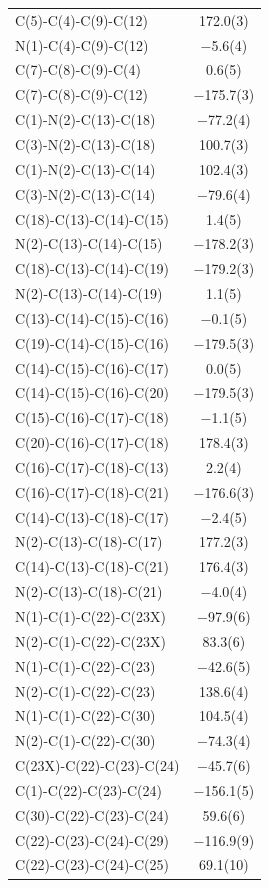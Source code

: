 \begin{center}
{\begin{supertabular}{p{1.8in}c}
C(5)-C(4)-C(9)-C(12)&172.0(3)\\
N(1)-C(4)-C(9)-C(12)&$-$5.6(4)\\
C(7)-C(8)-C(9)-C(4)&0.6(5)\\
C(7)-C(8)-C(9)-C(12)&$-$175.7(3)\\
C(1)-N(2)-C(13)-C(18)&$-$77.2(4)\\
C(3)-N(2)-C(13)-C(18)&100.7(3)\\
C(1)-N(2)-C(13)-C(14)&102.4(3)\\
C(3)-N(2)-C(13)-C(14)&$-$79.6(4)\\
C(18)-C(13)-C(14)-C(15)&1.4(5)\\
N(2)-C(13)-C(14)-C(15)&$-$178.2(3)\\
C(18)-C(13)-C(14)-C(19)&$-$179.2(3)\\
N(2)-C(13)-C(14)-C(19)&1.1(5)\\
C(13)-C(14)-C(15)-C(16)&$-$0.1(5)\\
C(19)-C(14)-C(15)-C(16)&$-$179.5(3)\\
C(14)-C(15)-C(16)-C(17)&0.0(5)\\
C(14)-C(15)-C(16)-C(20)&$-$179.5(3)\\
C(15)-C(16)-C(17)-C(18)&$-$1.1(5)\\
C(20)-C(16)-C(17)-C(18)&178.4(3)\\
C(16)-C(17)-C(18)-C(13)&2.2(4)\\
C(16)-C(17)-C(18)-C(21)&$-$176.6(3)\\
C(14)-C(13)-C(18)-C(17)&$-$2.4(5)\\
N(2)-C(13)-C(18)-C(17)&177.2(3)\\
C(14)-C(13)-C(18)-C(21)&176.4(3)\\
N(2)-C(13)-C(18)-C(21)&$-$4.0(4)\\
N(1)-C(1)-C(22)-C(23X)&$-$97.9(6)\\
N(2)-C(1)-C(22)-C(23X)&83.3(6)\\
N(1)-C(1)-C(22)-C(23)&$-$42.6(5)\\
N(2)-C(1)-C(22)-C(23)&138.6(4)\\
N(1)-C(1)-C(22)-C(30)&104.5(4)\\
N(2)-C(1)-C(22)-C(30)&$-$74.3(4)\\
C(23X)-C(22)-C(23)-C(24)&$-$45.7(6)\\
C(1)-C(22)-C(23)-C(24)&$-$156.1(5)\\
C(30)-C(22)-C(23)-C(24)&59.6(6)\\
C(22)-C(23)-C(24)-C(29)&$-$116.9(9)\\
C(22)-C(23)-C(24)-C(25)&69.1(10)\\

\end{supertabular}}
\end{center}
